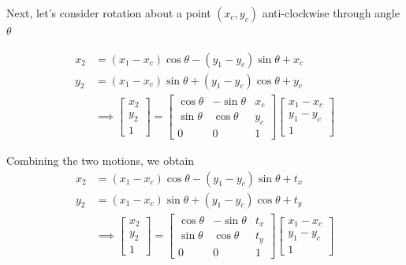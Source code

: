 \documentclass{report}
\begin{document}
Next, let's consider rotation about a point $(x_c,y_c)$ anti-clockwise through angle $\theta$

\begin{align}
  x_2 & = (x_1-x_c)\cos\theta - (y_1-y_c)\sin\theta + x_c \\
  y_2 & = (x_1-x_c)\sin\theta + (y_1-y_c)\cos\theta + y_c \\
      & \implies \begin{bmatrix}
                   x_2 \\
                   y_2 \\
                   1
                 \end{bmatrix}
  = \begin{bmatrix}
      \cos\theta & -\sin\theta & x_c \\
      \sin\theta & \cos\theta  & y_c \\
      0          & 0           & 1
    \end{bmatrix} \begin{bmatrix}
                    x_1-x_c \\
                    y_1-y_c \\
                    1
                  \end{bmatrix}
\end{align}

\noindent Combining the two motions, we obtain
\begin{align}
  x_2 & = (x_1-x_c)\cos\theta - (y_1-y_c)\sin\theta + t_x \\
  y_2 & = (x_1-x_c)\sin\theta + (y_1-y_c)\cos\theta + t_y \\
      & \implies \begin{bmatrix}
                   x_2 \\
                   y_2 \\
                   1
                 \end{bmatrix}
  = \begin{bmatrix}
      \cos\theta & -\sin\theta & t_x \\
      \sin\theta & \cos\theta  & t_y \\
      0          & 0           & 1
    \end{bmatrix} \begin{bmatrix}
                    x_1-x_c \\
                    y_1-y_c \\
                    1
                  \end{bmatrix}
\end{align}
\end{document}
